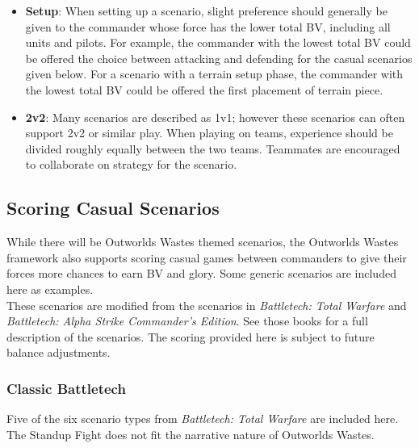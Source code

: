 \documentclass[UTF8]{article}
\begin{document}
\begin{itemize}

\item {\bf Setup}: When setting up a scenario, slight preference should generally be given to the commander whose force has the lower total BV, including all units and pilots.
For example, the commander with the lowest total BV could be offered the choice between attacking and defending for the casual scenarios given below.
For a scenario with a terrain setup phase, the commander with the lowest total BV could be offered the first placement of terrain piece.

\item {\bf 2v2}: Many scenarios are described as 1v1; however these scenarios can often support 2v2 or similar play.
When playing on teams, experience should be divided roughly equally between the two teams.
Teammates are encouraged to collaborate on strategy for the scenario.

\end{itemize}

\subsection{Scoring Casual Scenarios}

While there will be Outworlds Wastes themed scenarios, the Outworlds Wastes framework also supports scoring casual games between commanders to give their forces more chances to earn BV and glory.
Some generic scenarios are included here as examples.\\

These scenarios are modified from the scenarios in \emph{Battletech: Total Warfare} and \emph{Battletech: Alpha Strike Commander's Edition}.
See those books for a full description of the scenarios.
The scoring provided here is subject to future balance adjustments.\\

\subsubsection{Classic Battletech}

Five of the six scenario types from \emph{Battletech: Total Warfare} are included here.
The Standup Fight does not fit the narrative nature of Outworlds Wastes.\\
\end{document}
